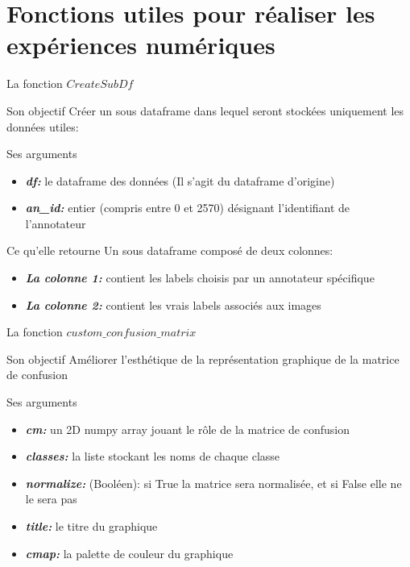 \documentclass[11pt]{beamer}
\begin{document}
	\section{Fonctions utiles pour réaliser les expériences numériques}
	\begin{frame}{La fonction $CreateSubDf$}
		\scriptsize
		\begin{block}{Son objectif}
			Créer un sous dataframe dans lequel seront stockées uniquement les données utiles:
	    \end{block}
    	\begin{block}{Ses arguments}
    		\begin{itemize}
    			\item \textit{\textbf{df:}} le dataframe des données (Il s'agit du dataframe d'origine) \\
    			\item \textbf{\textit{an\_id:}}  entier (compris entre 0 et 2570) désignant l'identifiant de l'annotateur
    		\end{itemize}
    	\end{block}
    \begin{block}{Ce qu'elle retourne}
    	Un sous dataframe composé de deux colonnes:
    	\begin{itemize}
    		\item \textbf{\textit{La colonne 1:}} contient les labels choisis par un annotateur spécifique
    		\item \textbf{\textit{La colonne 2:}} contient les vrais labels associés aux images
    	\end{itemize} 
    \end{block}
	\end{frame}

	\begin{frame}{La fonction $custom\_confusion\_matrix$}
		\small
		\begin{block}{Son objectif}
			Améliorer l'esthétique de la représentation graphique de la matrice de confusion
		\end{block}
		\begin{block}{Ses arguments}
			\begin{itemize}
			\item \textbf{\textit{cm:}} un 2D numpy array jouant le rôle de la matrice de confusion \\
			\item \textbf{\textit{classes:}} la liste stockant les noms de chaque classe \\
			\item \textbf{\textit{normalize:}} (Booléen): si True la matrice sera normalisée, et si False elle ne le sera pas \\
			\item \textbf{\textit{title:}} le titre du graphique \\
			\item \textbf{\textit{cmap:}} la palette de couleur du graphique
			\end{itemize}
		\end{block}
	\end{frame}
\end{document}
